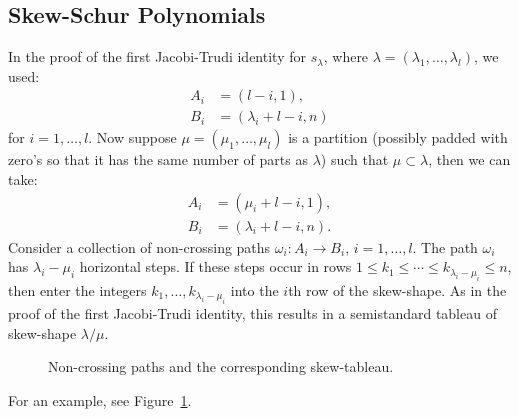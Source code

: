 \documentclass[11pt]{amsproc}
\theoremstyle{definition}
\theoremstyle{example}
\begin{document}
\subsection{Skew-Schur Polynomials}
\label{sec:skew-schur-functions}
In the proof of the first Jacobi-Trudi identity for $s_\lambda$, where $\lambda=(\lambda_1,\dotsc, \lambda_l)$, we used:
\begin{align*}
  A_i & = (l-i, 1),\\
  B_i & = (\lambda_i+l-i, n)
\end{align*}
for $i=1,\dotsc, l$.
Now suppose $\mu = (\mu_1,\dotsc, \mu_l)$ is a partition (possibly padded with zero's so that it has the same number of parts as $\lambda$) such that $\mu\subset \lambda$, then we can take:
\begin{align*}
  A_i & = (\mu_i+l-i, 1),\\
  B_i & = (\lambda_i+l-i, n).
\end{align*}
Consider a collection of non-crossing paths $\omega_i:A_i\to B_i$, $i=1,\dotsc,l$.
The path $\omega_i$ has $\lambda_i-\mu_i$ horizontal steps.
If these steps occur in rows $1\leq k_1\leq \dotsb \leq k_{\lambda_i-\mu_i}\leq n$, then enter the integers $k_1,\dotsc,k_{\lambda_i-\mu_i}$ into the $i$th row of the skew-shape.
As in the proof of the first Jacobi-Trudi identity, this results in a semistandard tableau of skew-shape $\lambda/\mu$.
\begin{figure}[h]
  \centering 
    \hspace{1cm}  
  \caption{Non-crossing paths and the corresponding skew-tableau.}
  \label{fig:skew-jth}
\end{figure}
For an example, see Figure~\ref{fig:skew-jth}.
\end{document}
